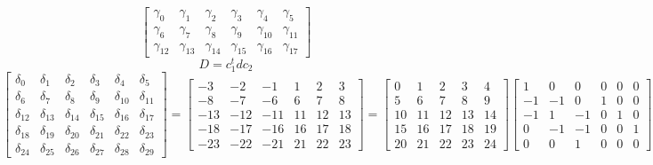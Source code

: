 \documentclass{article}%
\begin{document}
\[\left[\begin{matrix}\gamma_{0} & \gamma_{1} & \gamma_{2} & \gamma_{3} & \gamma_{4} & \gamma_{5}\\\gamma_{6} & \gamma_{7} & \gamma_{8} & \gamma_{9} & \gamma_{10} & \gamma_{11}\\\gamma_{12} & \gamma_{13} & \gamma_{14} & \gamma_{15} & \gamma_{16} & \gamma_{17}\end{matrix}\right]%
\]%
\[%
D = c_1^t d c_2%
\]%
\[%
\left[\begin{matrix}\delta_{0} & \delta_{1} & \delta_{2} & \delta_{3} & \delta_{4} & \delta_{5}\\\delta_{6} & \delta_{7} & \delta_{8} & \delta_{9} & \delta_{10} & \delta_{11}\\\delta_{12} & \delta_{13} & \delta_{14} & \delta_{15} & \delta_{16} & \delta_{17}\\\delta_{18} & \delta_{19} & \delta_{20} & \delta_{21} & \delta_{22} & \delta_{23}\\\delta_{24} & \delta_{25} & \delta_{26} & \delta_{27} & \delta_{28} & \delta_{29}\end{matrix}\right] = \left[\begin{matrix}-3 & -2 & -1 & 1 & 2 & 3\\-8 & -7 & -6 & 6 & 7 & 8\\-13 & -12 & -11 & 11 & 12 & 13\\-18 & -17 & -16 & 16 & 17 & 18\\-23 & -22 & -21 & 21 & 22 & 23\end{matrix}\right] = \left[\begin{matrix}0 & 1 & 2 & 3 & 4\\5 & 6 & 7 & 8 & 9\\10 & 11 & 12 & 13 & 14\\15 & 16 & 17 & 18 & 19\\20 & 21 & 22 & 23 & 24\end{matrix}\right] \left[\begin{matrix}1 & 0 & 0 & 0 & 0 & 0\\-1 & -1 & 0 & 1 & 0 & 0\\-1 & 1 & -1 & 0 & 1 & 0\\0 & -1 & -1 & 0 & 0 & 1\\0 & 0 & 1 & 0 & 0 & 0\end{matrix}\right]%
\]%
\end{document}
